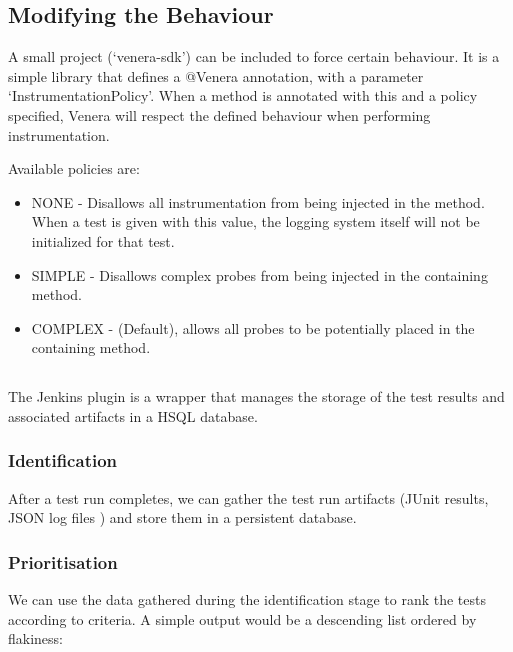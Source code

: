 \subsection{Modifying the Behaviour}

A small project ({\lq}venera-sdk{\rq}) can be included to force certain
behaviour. It is a simple library that defines a @Venera annotation, with a
parameter {\lq}InstrumentationPolicy{\rq}. When a method is annotated with this
and a policy specified, Venera will respect the defined behaviour when
performing instrumentation.

Available policies are:

\begin{itemize}
  \item NONE - Disallows all instrumentation from being injected in the method.
  When a test is given with this value, the logging system itself will not be
  initialized for that test.
  \item SIMPLE - Disallows complex probes from being injected in the containing
  method.
  \item COMPLEX - (Default), allows all probes to be potentially placed in the
  containing method.
\end{itemize}


\subsection{\jenkinsPlugin}
\label{sec:sec:jenkins_plugin}

The Jenkins plugin is a wrapper that manages the storage of the test results and
associated artifacts in a HSQL database.

\subsubsection{Identification}

After a test run completes, we can gather the test run artifacts (JUnit results,
\venera JSON log files \etc) and store them in a persistent database.

\subsubsection{Prioritisation}

We can use the data gathered during the identification stage to rank the tests
according to criteria. A simple output would be a descending list ordered by
flakiness:

